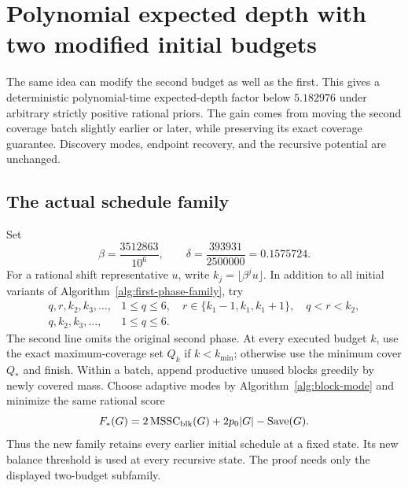 ﻿\section{Polynomial expected depth with two modified initial budgets}
\label{sec:two-phase}

The same idea can modify the second budget as well as the first.
This gives a deterministic polynomial-time expected-depth factor
below $5.182976$ under arbitrary strictly positive rational priors.
The gain comes from moving the second coverage batch slightly earlier
or later, while preserving its exact coverage guarantee. Discovery
modes, endpoint recovery, and the recursive potential are unchanged.

\subsection{The actual schedule family}

Set
\begin{equation}\label{eq:two-phase-parameters}
 \beta=\frac{3512863}{10^6},\qquad
 \delta=\frac{393931}{2500000}=0.1575724.
\end{equation}
For a rational shift representative $u$, write
$k_j=\lfloor\beta^ju\rfloor$. In addition to all initial variants of
Algorithm~\ref{alg:first-phase-family}, try
\[
 \begin{array}{ll}
 q,r,k_2,k_3,\ldots,
 &1\le q\le6,\quad r\in\{k_1-1,k_1,k_1+1\},\quad q<r<k_2,\\
 q,k_2,k_3,\ldots,&1\le q\le6.
 \end{array}
\]
The second line omits the original second phase. At every executed
budget $k$, use the exact maximum-coverage set $Q_k$ if
$k<k_{\min}$; otherwise use the minimum cover $Q_*$ and finish.
Within a batch, append productive unused blocks greedily by newly
covered mass. Choose adaptive modes by Algorithm~\ref{alg:block-mode}
and minimize the same rational score
\[
 F_*(G)=2\operatorname{MSSC}_{\rm blk}(G)+2p_0|G|-\operatorname{Save}(G).
\]
Thus the new family retains every earlier initial schedule at a fixed
state. Its new balance threshold is used at every recursive state.
The proof needs only the displayed two-budget subfamily.

